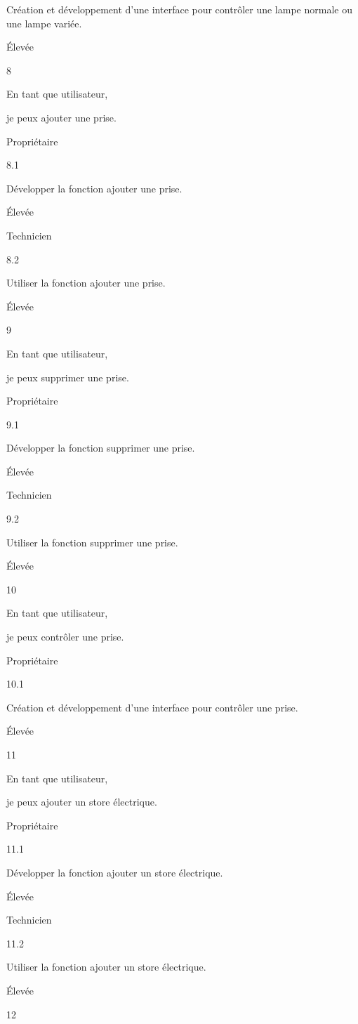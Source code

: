 \documentclass{article}
\begin{document}
Création et développement d’une interface pour  contrôler   une lampe normale ou  une lampe variée.

Élevée

8

En tant que utilisateur,

je peux ajouter  une prise.

Propriétaire

8.1

Développer la fonction ajouter  une prise.

Élevée

Technicien

8.2

Utiliser la fonction   ajouter  une prise.

Élevée

9

En tant que utilisateur,

je peux supprimer  une prise.

Propriétaire

9.1

Développer la fonction supprimer  une prise.

Élevée

Technicien

9.2

Utiliser la fonction   supprimer  une prise.

Élevée

10

En tant que utilisateur,

je peux contrôler   une prise.

Propriétaire

10.1

Création et développement d’une interface pour  contrôler   une prise.

Élevée

11

En tant que utilisateur,

je peux ajouter  un store électrique.

Propriétaire

11.1

Développer la fonction ajouter  un store électrique.

Élevée

Technicien

11.2

Utiliser la fonction   ajouter  un store électrique.

Élevée

12
\end{document}
